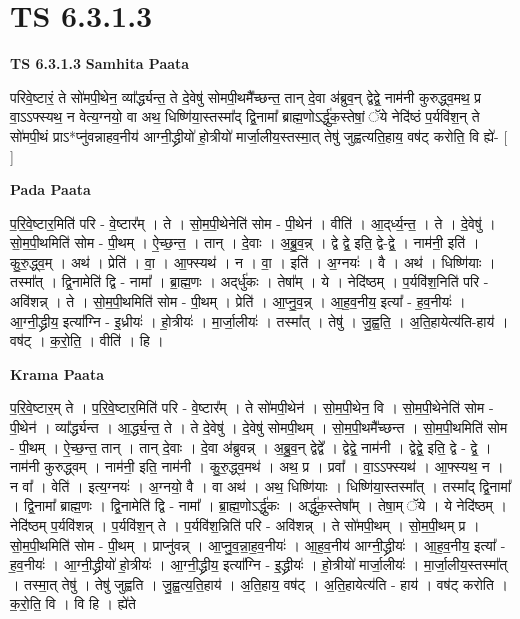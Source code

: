 \documentclass[17pt]{extarticle}
\begin{document}
\section{ TS 6.3.1.3 }

\textbf{TS 6.3.1.3 } \newline
\textbf{Samhita Paata} \newline

परिवे॒ष्टारं॒ ते सो॑मपी॒थेन॒ व्या᳚र्द्ध्यन्त॒ ते दे॒वेषु॑ सोमपी॒थमै᳚च्छन्त॒ तान् दे॒वा अ॑ब्रुव॒न् द्वेद्वे॒ नाम॑नी कुरुद्ध्व॒मथ॒ प्र वा॒ऽऽफ्स्यथ॒ न वेत्य॒ग्नयो॒ वा अथ॒ धिष्णि॑या॒स्तस्मा᳚द् द्वि॒नामा᳚ ब्राह्म॒णोऽर्द्धु॑क॒स्तेषां॒ ॅये नेदि॑ष्ठं प॒र्यवि॑श॒न् ते सो॑मपी॒थं प्राऽ*प्नु॑वन्नाहव॒नीय॑ आग्नी॒द्ध्रीयो॑ हो॒त्रीयो॑ मार्जा॒लीय॒स्तस्मा॒त् तेषु॑ जुह्वत्यति॒हाय॒ वष॑ट् करोति॒ वि ह्ये॑- [  ] \newline

\textbf{Pada Paata} \newline

प॒रि॒वे॒ष्टार॒मिति॑ परि - वे॒ष्टार᳚म् । ते । सो॒म॒पी॒थेनेति॑ सोम - पी॒थेन॑ । वीति॑ । आ॒द्‌र्ध्य॒न्त॒ । ते । दे॒वेषु॑ । सो॒म॒पी॒थमिति॑ सोम - पी॒थम् । ऐ॒च्छ॒न्त॒ । तान् । दे॒वाः । अ॒ब्रु॒व॒न्न् । द्वे द्वे॒ इति॒ द्वे-द्वे॒ । नाम॑नी॒ इति॑ । कु॒रु॒द्ध्व॒म् । अथ॑ । प्रेति॑ । वा॒ । आ॒फ्स्यथ॑ । न । वा॒ । इति॑ । अ॒ग्नयः॑ । वै । अथ॑ । धिष्णि॑याः । तस्मा᳚त् । द्वि॒नामेति॑ द्वि - नामा᳚ । ब्रा॒ह्म॒णः । अद्‌र्धु॑कः । तेषा᳚म् । ये । नेदि॑ष्ठम् । प॒र्यवि॑श॒निति॑ परि - अवि॑शन्न् । ते । सो॒म॒पी॒थमिति॑ सोम - पी॒थम् । प्रेति॑ । आ॒प्नु॒व॒न्न् । आ॒ह॒व॒नीय॒ इत्या᳚ - ह॒व॒नीयः॑ । आ॒ग्नी॒द्ध्रीय॒ इत्या᳚ग्नि - इ॒ध्रीयः॑ । हो॒त्रीयः॑ । मा॒र्जा॒लीयः॑ । तस्मा᳚त् । तेषु॑ । जु॒ह्व॒ति॒ । अ॒ति॒हायेत्य॑ति-हाय॑ । वष॑ट् । क॒रो॒ति॒ । वीति॑ । हि ।  \newline


\textbf{Krama Paata} \newline

प॒रि॒वे॒ष्टार॒म् ते । प॒रि॒वे॒ष्टार॒मिति॑ परि - वे॒ष्टार᳚म् । ते सो॑मपी॒थेन॑ । सो॒म॒पी॒थेन॒ वि । सो॒म॒पी॒थेनेति॑ सोम - पी॒थेन॑ । व्या᳚र्द्ध्यन्त । आ॒र्द्ध्य॒न्त॒ ते । ते दे॒वेषु॑ । दे॒वेषु॑ सोमपी॒थम् । सो॒म॒पी॒थमै᳚च्छन्त । सो॒म॒पी॒थमिति॑ सोम - पी॒थम् । ऐ॒च्छ॒न्त॒ तान् । तान् दे॒वाः । दे॒वा अ॑ब्रुवन्न् । अ॒ब्रु॒व॒न् द्वेद्वे᳚ । द्वेद्वे॒ नाम॑नी । द्वेद्वे॒ इति॒ द्वे - द्वे॒ । नाम॑नी कुरुद्ध्वम् । नाम॑नी॒ इति॒ नाम॑नी । कु॒रु॒द्ध्व॒मथ॑ । अथ॒ प्र । प्रवा᳚ । वा॒ऽऽफ्स्यथ॑ । आ॒फ्स्यथ॒ न । न वा᳚ । वेति॑ । इत्य॒ग्नयः॑ । अ॒ग्नयो॒ वै । वा अथ॑ । अथ॒ धिष्णि॑याः । धिष्णि॑या॒स्तस्मा᳚त् । तस्मा᳚द् द्वि॒नामा᳚ । द्वि॒नामा᳚ ब्राह्म॒णः । द्वि॒नामेति॑ द्वि - नामा᳚ । ब्रा॒ह्म॒णोऽर्द्धु॑कः । अर्द्धु॑क॒स्तेषा᳚म् । तेषा॒म् ॅये । ये नेदि॑ष्ठम् । नेदि॑ष्ठम् प॒र्यवि॑शन्न् । प॒र्यवि॑श॒न् ते । प॒र्यवि॑श॒न्निति॑ परि - अवि॑शन्न् । ते सो॑मपी॒थम् । सो॒म॒पी॒थम् प्र । सो॒म॒पी॒थमिति॑ सोम - पी॒थम् । प्राप्नु॑वन्न् । आ॒प्नु॒व॒न्ना॒ह॒व॒नीयः॑ । आ॒ह॒व॒नीय॑ आग्नी॒द्ध्रीयः॑ । आ॒ह॒व॒नीय॒ इत्या᳚ - ह॒व॒नीयः॑ । आ॒ग्नी॒द्ध्रीयो॑ हो॒त्रीयः॑ । आ॒ग्नी॒द्ध्रीय॒ इत्या᳚ग्नि - इ॒द्ध्रीयः॑ । हो॒त्रीयो॑ मार्जा॒लीयः॑ । मा॒र्जा॒लीय॒स्तस्मा᳚त् । तस्मा॒त् तेषु॑ । तेषु॑ जुह्वति । जु॒ह्व॒त्य॒ति॒हाय॑ । अ॒ति॒हाय॒ वष॑ट् । अ॒ति॒हायेत्य॑ति - हाय॑ । वष॑ट् करोति । क॒रो॒ति॒ वि । वि हि । ह्ये॑ते \newline
\end{document}
